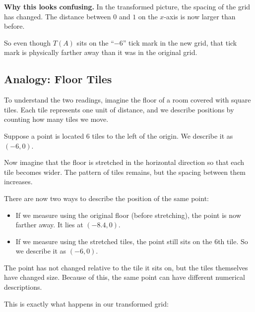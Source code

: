 \documentclass[11pt,openany]{book}
\theoremstyle{definition}
\begin{document}
\medskip

\textbf{Why this looks confusing.} In the transformed picture, the spacing of the grid has changed.
The distance between $0$ and $1$ on the $x$-axis is now larger than before.

\medskip

So even though $T(A)$ sits on the ``$-6$'' tick mark in the new grid, that tick mark is physically
farther away than it was in the original grid.

\medskip

\subsection{Analogy: Floor Tiles}

To understand the two readings, imagine the floor of a room covered with square tiles.
Each tile represents one unit of distance, and we describe positions by counting how many tiles we move.

\medskip

Suppose a point is located 6 tiles to the left of the origin. We describe it as $(-6, 0)$.

\medskip

Now imagine that the floor is stretched in the horizontal direction so that each tile becomes wider.
The pattern of tiles remains, but the spacing between them increases.

\medskip

There are now two ways to describe the position of the same point:

\begin{itemize}
  \item If we measure using the original floor (before stretching), the point is now farther away.
  It lies at $(-8.4, 0)$.

  \item If we measure using the stretched tiles, the point still sits on the 6th tile.
  So we describe it as $(-6, 0)$.
\end{itemize}

\medskip

\begin{keyidea} The point has not changed relative to the tile it sits on, but the tiles themselves
have changed size. Because of this, the same point can have different numerical descriptions. \end{keyidea}

\medskip

This is exactly what happens in our transformed grid:
\end{document}
